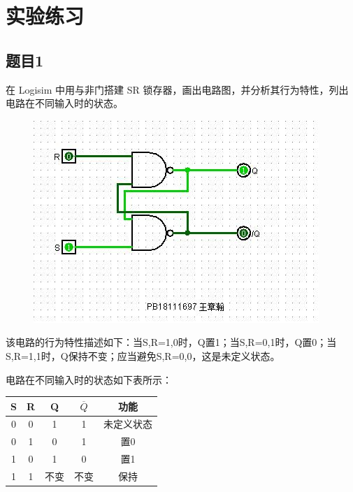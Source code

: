\documentclass[UTF8]{article}
\begin{document}
	
	
	\section{实验练习}
	\subsection{题目1}
	在 Logisim 中用与非门搭建 SR 锁存器，画出电路图，并分析其行为特性，列出电路在不同输入时的状态。\par
	\begin{figure}[H]
		\centering
		\includegraphics[width=1\linewidth]{p1_SR_Letch_NAND.jpg}
		\label{p1_SR_Letch_NAND}
	\end{figure}
	该电路的行为特性描述如下：当S,R=1,0时，Q置1；当S,R=0,1时，Q置0；当S,R=1,1时，Q保持不变；应当避免S,R=0,0，这是未定义状态。\par
	电路在不同输入时的状态如下表所示：\par
	\begin{tabular}{|c|c|c|c|c|}
		\hline 
		\rule[-1ex]{0pt}{2.5ex} S & R & Q & $\overline{Q}$ & 功能 \\ 
		\hline 
		\rule[-1ex]{0pt}{2.5ex} 0 & 0 & 1 & 1 & 未定义状态 \\ 
		\hline 
		\rule[-1ex]{0pt}{2.5ex} 0 & 1 & 0 & 1 & 置0 \\ 
		\hline 
		\rule[-1ex]{0pt}{2.5ex} 1 & 0 & 1 & 0 & 置1 \\ 
		\hline 
		\rule[-1ex]{0pt}{2.5ex} 1 & 1 & 不变 & 不变 & 保持 \\ 
		\hline 
	\end{tabular} 
\end{document}

